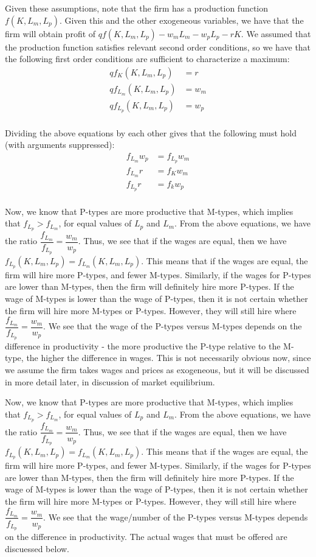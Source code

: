 \documentclass[12pt]{article}
\begin{document}
\begin{enumerate}
Given these assumptions, note that the firm has a production function $f(K,L_m,L_p)$.  Given this and the other exogeneous variables, we have that the firm will obtain profit of $q f(K,L_m,L_p) - w_m L_m - w_p L_p - rK$.  We assumed that the production function satisfies relevant second order conditions, so we have that the following first order conditions are sufficient to characterize a maximum:
\begin{align*}
q f_K(K, L_m, L_p) &= r \\
q f_{L_m}(K, L_m, L_p) &= w_m \\
q f_{L_p}(K, L_m, L_p) &= w_p \\
\end{align*}

Dividing the above equations by each other gives that the following must hold (with arguments suppressed):
\begin{align*}
f_{L_m} w_p &= f_{L_p} w_m \\
f_{L_m} r &= f_K w_m \\
f_{L_p} r &= f_k w_p \\
\end{align*}

Now, we know that P-types are more productive that M-types, which implies that $f_{L_p} > f_{L_m}$, for equal values of $L_p$ and $L_m$.  From the above equations, we have the ratio $\dfrac{f_{L_m}}{f_{L_p}} = \dfrac{w_m}{w_p}$.  Thus, we see that if the wages are equal, then we have $f_{L_p}(K,L_m,L_p) = f_{L_m}(K,L_m,L_p)$.  This means that if the wages are equal, the firm will hire more P-types, and fewer M-types.  Similarly, if the wages for P-types are lower than M-types, then the firm will definitely hire more P-types.  If the wage of M-types is lower than the wage of P-types, then it is not certain whether the firm will hire more M-types or P-types.  However, they will still hire where $\dfrac{f_{L_m}}{f_{L_p}} = \dfrac{w_m}{w_p}$.  We see that the wage of the P-types versus M-types depends on the difference in productivity - the more productive the P-type relative to the M-type, the higher the difference in wages.  This is not necessarily obvious now, since we assume the firm takes wages and prices as exogeneous, but it will be discussed in more detail later, in discussion of market equilibrium.  

Now, we know that P-types are more productive that M-types, which implies that $f_{L_p} > f_{L_m}$, for equal values of $L_p$ and $L_m$.  From the above equations, we have the ratio $\dfrac{f_{L_m}}{f_{L_p}} = \dfrac{w_m}{w_p}$.  Thus, we see that if the wages are equal, then we have $f_{L_p}(K,L_m,L_p) = f_{L_m}(K,L_m,L_p)$.  This means that if the wages are equal, the firm will hire more P-types, and fewer M-types.  Similarly, if the wages for P-types are lower than M-types, then the firm will definitely hire more P-types.  If the wage of M-types is lower than the wage of P-types, then it is not certain whether the firm will hire more M-types or P-types.  However, they will still hire where $\dfrac{f_{L_m}}{f_{L_p}} = \dfrac{w_m}{w_p}$.  We see that the wage/number of the P-types versus M-types depends on the difference in productivity.  The actual wages that must be offered are discuessed below. 


\end{enumerate}
\end{document}
